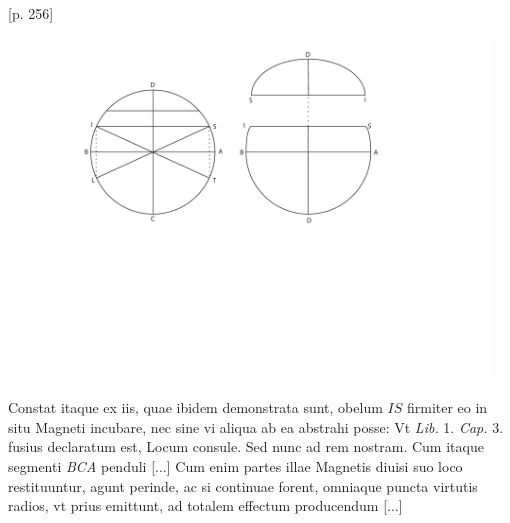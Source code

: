 \pend
\newpage
\pstart  
[p. 256]
\pend
\count{}
\vspace*{-5mm}
\begin{center}                    
\includegraphics[width=0.96\textwidth]{images/leotaud1668-d1.pdf}\\
\noindent {} 
\end{center}
\pstart {}
Constat itaque ex iis, quae ibidem demonstrata sunt, obelum $IS$ firmiter eo in situ Magneti\protect{} incubare, nec sine vi aliqua ab ea abstrahi posse:
\pend 
\pstart [p. 257] Vt \textit{Lib.} 1. \textit{Cap.} 3. fusius declaratum est, Locum consule. Sed nunc ad rem nostram.
\pend
\pstart Cum itaque segmenti \textit{BCA} penduli [...]
\pend 
\count{}
\pstart
[p. 263] Cum enim partes illae Magnetis\protect{} diuisi suo loco restituuntur, agunt perinde, ac si continuae forent, omniaque puncta virtutis radios, vt prius emittunt,  ad totalem effectum producendum [...]
